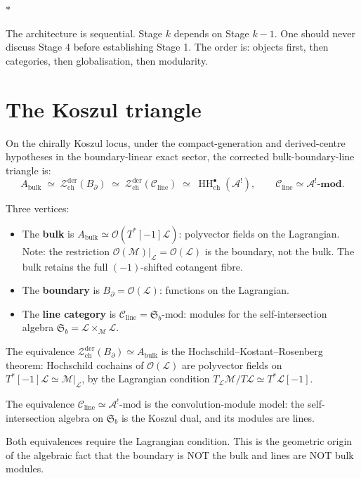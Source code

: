 \documentclass[11pt]{article}
\newcommand{\cA}{\mathcal{A}}
\newcommand{\cC}{\mathcal{C}}
\newcommand{\cM}{\mathcal{M}}
\newcommand{\cO}{\mathcal{O}}
\newcommand{\cZ}{\mathcal{Z}}
\newcommand{\cL}{\mathcal{L}}
\newcommand{\HH}{\operatorname{HH}}
\newcommand{\Zder}{\cZ^{\mathrm{der}}_{\mathrm{ch}}}
\newcommand{\sep}{\bigskip\begin{center}$*$\end{center}\medskip}
\begin{document}
\sep

The architecture is sequential.  Stage $k$ depends on Stage $k-1$.
One should never discuss Stage 4 before establishing Stage 1.
The order is: objects first, then categories, then globalisation,
then modularity.


\section{The Koszul triangle}
\label{sec:koszul-triangle}

On the chirally Koszul locus, under the compact-generation and
derived-centre hypotheses in the boundary-linear exact sector, the
corrected bulk-boundary-line triangle is:
\begin{equation}\label{eq:triangle-wn}
A_{\mathrm{bulk}}
\;\simeq\;
\Zder(B_\partial)
\;\simeq\;
\Zder(\cC_{\mathrm{line}})
\;\simeq\;
\HH^\bullet_{\mathrm{ch}}(\cA^!),
\qquad
\cC_{\mathrm{line}} \simeq \cA^!\text{-}\mathbf{mod}.
\end{equation}

Three vertices:
\begin{itemize}[nosep]
\item The \textbf{bulk} is
  $A_{\mathrm{bulk}} \simeq \cO(T^*[-1]\cL)$: polyvector fields
  on the Lagrangian.  Note: the restriction
  $\cO(\cM)|_\cL = \cO(\cL)$ is the boundary, not the bulk.
  The bulk retains the full $(-1)$-shifted cotangent fibre.
\item The \textbf{boundary} is $B_\partial = \cO(\cL)$: functions
  on the Lagrangian.
\item The \textbf{line category} is
  $\cC_{\mathrm{line}} = \mathfrak{S}_b\text{-mod}$: modules for
  the self-intersection algebra
  $\mathfrak{S}_b = \cL \times_\cM \cL$.
\end{itemize}

The equivalence $\Zder(B_\partial) \simeq A_{\mathrm{bulk}}$ is
the Hochschild--Kostant--Rosenberg theorem: Hochschild cochains of
$\cO(\cL)$ are polyvector fields on $T^*[-1]\cL \simeq \cM|_\cL$,
by the Lagrangian condition
$T_\cL\cM / T\cL \simeq T^*\cL[-1]$.

The equivalence $\cC_{\mathrm{line}} \simeq \cA^!\text{-mod}$ is
the convolution-module model: the self-intersection algebra on
$\mathfrak{S}_b$ is the Koszul dual, and its modules are lines.

Both equivalences require the Lagrangian condition.  This is the
geometric origin of the algebraic fact that the boundary is NOT
the bulk and lines are NOT bulk modules.
\end{document}
